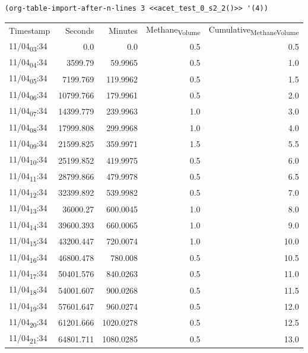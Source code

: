 \documentclass[11pt]{article}
\begin{document}
\begin{verbatim}
(org-table-import-after-n-lines 3 <<acet_test_0_s2_2()>> '(4))
\end{verbatim}

\begin{center}
\begin{tabular}{lrrrr}
Timestamp & Seconds & Minutes & Methane\textsubscript{Volume} & Cumulative\textsubscript{Methane}\textsubscript{Volume}\\[0pt]
11/04\textsubscript{03}:34 & 0.0 & 0.0 & 0.5 & 0.5\\[0pt]
11/04\textsubscript{04}:34 & 3599.79 & 59.9965 & 0.5 & 1.0\\[0pt]
11/04\textsubscript{05}:34 & 7199.769 & 119.9962 & 0.5 & 1.5\\[0pt]
11/04\textsubscript{06}:34 & 10799.766 & 179.9961 & 0.5 & 2.0\\[0pt]
11/04\textsubscript{07}:34 & 14399.779 & 239.9963 & 1.0 & 3.0\\[0pt]
11/04\textsubscript{08}:34 & 17999.808 & 299.9968 & 1.0 & 4.0\\[0pt]
11/04\textsubscript{09}:34 & 21599.825 & 359.9971 & 1.5 & 5.5\\[0pt]
11/04\textsubscript{10}:34 & 25199.852 & 419.9975 & 0.5 & 6.0\\[0pt]
11/04\textsubscript{11}:34 & 28799.866 & 479.9978 & 0.5 & 6.5\\[0pt]
11/04\textsubscript{12}:34 & 32399.892 & 539.9982 & 0.5 & 7.0\\[0pt]
11/04\textsubscript{13}:34 & 36000.27 & 600.0045 & 1.0 & 8.0\\[0pt]
11/04\textsubscript{14}:34 & 39600.393 & 660.0065 & 1.0 & 9.0\\[0pt]
11/04\textsubscript{15}:34 & 43200.447 & 720.0074 & 1.0 & 10.0\\[0pt]
11/04\textsubscript{16}:34 & 46800.478 & 780.008 & 0.5 & 10.5\\[0pt]
11/04\textsubscript{17}:34 & 50401.576 & 840.0263 & 0.5 & 11.0\\[0pt]
11/04\textsubscript{18}:34 & 54001.607 & 900.0268 & 0.5 & 11.5\\[0pt]
11/04\textsubscript{19}:34 & 57601.647 & 960.0274 & 0.5 & 12.0\\[0pt]
11/04\textsubscript{20}:34 & 61201.666 & 1020.0278 & 0.5 & 12.5\\[0pt]
11/04\textsubscript{21}:34 & 64801.711 & 1080.0285 & 0.5 & 13.0\\[0pt]

\end{tabular}
\end{center}
\end{document}

